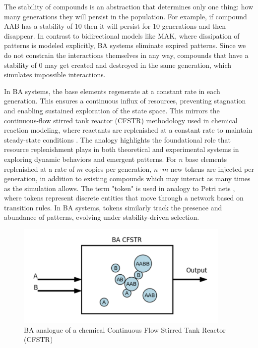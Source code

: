 \documentclass[preprint,12pt]{elsarticle}
\begin{document}
The stability of compounds is an abstraction that determines only one thing: how many generations they will persist in the population. For example, if compound AAB has a stability of 10 then it will persist for 10 generations and then disappear. In contrast to bidirectional models like MAK, where dissipation of patterns is modeled explicitly, BA systems eliminate expired patterns. Since we do not constrain the interactions themselves in any way, compounds that have a stability of 0 may get created and destroyed in the same generation, which simulates impossible interactions. 

In BA systems, the base elements regenerate at a constant rate in each generation. This ensures a continuous influx of resources, preventing stagnation and enabling sustained exploration of the state space. This mirrors the continuous-flow stirred tank reactor (CFSTR) methodology used in chemical reaction modeling, where reactants are replenished at a constant rate to maintain steady-state conditions \cite{fogler1999chemical}. The analogy highlights the foundational role that resource replenishment plays in both theoretical and experimental systems in exploring dynamic behaviors and emergent patterns. For \( n \) base elements replenished at a rate of \( m \) copies per generation, \( n \cdot m \) new tokens are injected per generation, in addition to existing compounds which may interact as many times as the simulation allows. The term "token" is used in analogy to Petri nets \cite{petri1962communication}, where tokens represent discrete entities that move through a network based on transition rules. In BA systems, tokens similarly track the presence and abundance of patterns, evolving under stability-driven selection.


\begin{figure}[htp]
    \centering
    \includegraphics[height=5cm]{figure_1}
    \caption{BA analogue of a chemical Continuous Flow Stirred Tank Reactor (CFSTR)}
    \label{fig:figure_1}
\end{figure}
\end{document}
